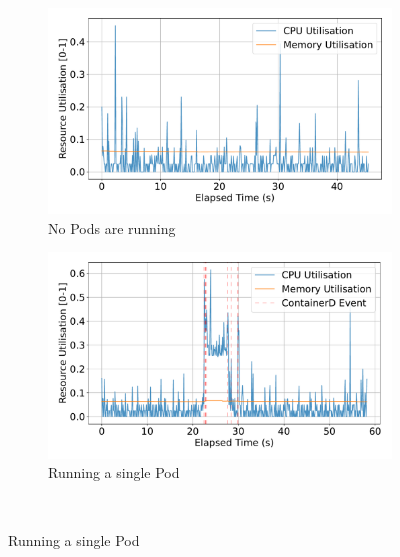 \begin{figure}[ht!] %
    \centering %

    \begin{subfigure}[b]{0.48\textwidth} %
        \centering
        \includegraphics[width=\linewidth]{images/utilisation-baseline.pdf}
        \caption{No Pods are running} %
        \label{fig:utilisation-baseline} %
    \end{subfigure}%
    \hfill %
    \begin{subfigure}[b]{0.48\textwidth}
        \centering
        \includegraphics[width=\linewidth]{images/utilisation-single.pdf}
        \caption{Running a single Pod} %
        \label{fig:utilisation-single}
    \end{subfigure}
    \\[1em] %


\end{figure}
